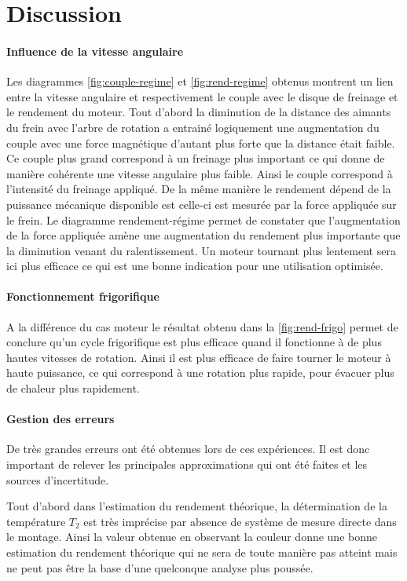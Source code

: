 \section{Discussion}




\paragraph*{Influence de la vitesse angulaire}
Les diagrammes \autoref{fig:couple-regime} et \autoref{fig:rend-regime} obtenus montrent un lien entre la vitesse angulaire et respectivement le couple avec le disque de freinage et le rendement du moteur. Tout d'abord la diminution de la distance des aimants du frein avec l'arbre de rotation a entrainé logiquement une augmentation du couple avec une force magnétique d'autant plus forte que la distance était faible. Ce couple plus grand correspond à un freinage plus important ce qui donne de manière cohérente une vitesse angulaire plus faible. Ainsi le couple correspond à l'intensité du freinage appliqué. De la même manière le rendement dépend de la puissance mécanique disponible est celle-ci est mesurée par la force appliquée sur le frein. Le diagramme rendement-régime permet de constater que l'augmentation de la force appliquée amène une augmentation du rendement plus importante que la diminution venant du ralentissement. Un moteur tournant plus lentement sera ici plus efficace ce qui est une bonne indication pour une utilisation optimisée.

\paragraph*{Fonctionnement frigorifique}
A la différence du cas moteur le résultat obtenu dans la \autoref{fig:rend-frigo} permet de conclure qu'un cycle frigorifique est plus efficace quand il fonctionne à de plus hautes vitesses de rotation. Ainsi il est plus efficace de faire tourner le moteur à haute puissance, ce qui correspond à une rotation plus rapide, pour évacuer plus de chaleur plus rapidement.


\paragraph*{Gestion des erreurs}
De très grandes erreurs ont été obtenues lors de ces expériences. Il est donc important de relever les principales approximations qui ont été faites et les sources d'incertitude.

Tout d'abord dans l'estimation du rendement théorique, la détermination de la température \(T_2\) est très imprécise par absence de système de mesure directe dans le montage. Ainsi la valeur obtenue en observant la couleur donne une bonne estimation du rendement théorique qui ne sera de toute manière pas atteint mais ne peut pas être la base d'une quelconque analyse plus poussée.

